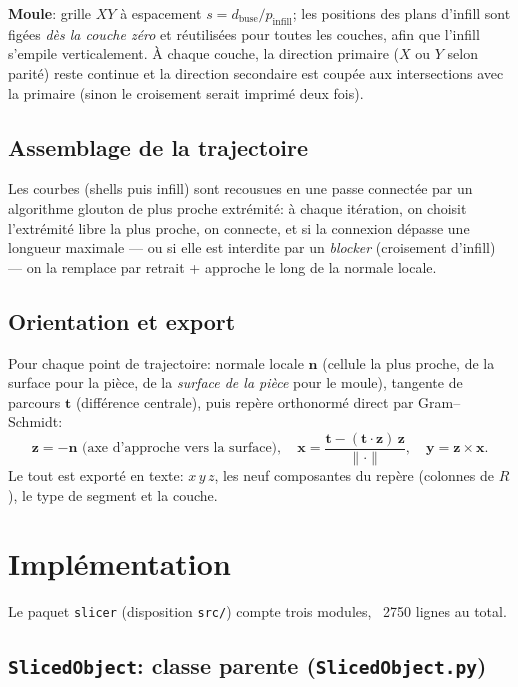 \documentclass[11pt,a4paper]{article}
\begin{document}
\textbf{Moule}: grille $XY$ à espacement
$s = d_{\text{buse}} / p_{\text{infill}}$; les positions des plans
d'infill sont figées \emph{dès la couche zéro} et réutilisées pour
toutes les couches, afin que l'infill s'empile verticalement. À chaque
couche, la direction primaire ($X$ ou $Y$ selon parité) reste continue
et la direction secondaire est coupée aux intersections avec la
primaire (sinon le croisement serait imprimé deux fois).

\subsection{Assemblage de la trajectoire}
Les courbes (shells puis infill) sont recousues en une passe
connectée par un algorithme glouton de plus proche extrémité: à chaque
itération, on choisit l'extrémité libre la plus proche, on connecte,
et si la connexion dépasse une longueur maximale --- ou si elle est
interdite par un \emph{blocker} (croisement d'infill) --- on la
remplace par retrait + approche le long de la normale locale.

\subsection{Orientation et export}
Pour chaque point de trajectoire: normale locale $\mathbf{n}$ (cellule
la plus proche, de la surface pour la pièce, de la \emph{surface de la
pièce} pour le moule), tangente de parcours $\mathbf{t}$ (différence
centrale), puis repère orthonormé direct par Gram--Schmidt:
\begin{equation}
  \mathbf{z} = -\mathbf{n} \text{ (axe d'approche vers la surface)}, \quad
  \mathbf{x} = \frac{\mathbf{t} - (\mathbf{t}\cdot\mathbf{z})\,\mathbf{z}}{\|\cdot\|}, \quad
  \mathbf{y} = \mathbf{z}\times\mathbf{x}.
\end{equation}
Le tout est exporté en texte: $x\,y\,z$, les neuf composantes du
repère (colonnes de $R$), le type de segment et la couche.

\section{Implémentation}\label{sec:impl}

Le paquet \texttt{slicer} (disposition \texttt{src/}) compte trois
modules, ~2750 lignes au total.

\subsection{\texttt{SlicedObject}: classe parente (\texttt{SlicedObject.py})}
\label{sec:impl-object}
\end{document}
